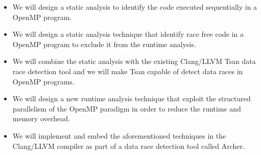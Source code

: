 \begin{itemize}
\item We will design a static analysis to identify the code executed
  sequentially in a OpenMP program.
\item We will design a static analysis technique that identify race free code
  in a OpenMP program to exclude it from the runtime analysis.
\item We will combine the static analysis with the existing Clang/LLVM Tsan
  data race detection tool and we will make Tsan capable of detect data races
  in OpenMP programs.
\item We will design a new runtime analysis technique that exploit the
  structured parallelism of the OpenMP paradigm in order to reduce the runtime
  and memory overhead.
\item We will implement and embed the aforementioned techniques in the
  Clang/LLVM compiler as part of a data race detection tool called Archer.
\end{itemize}


